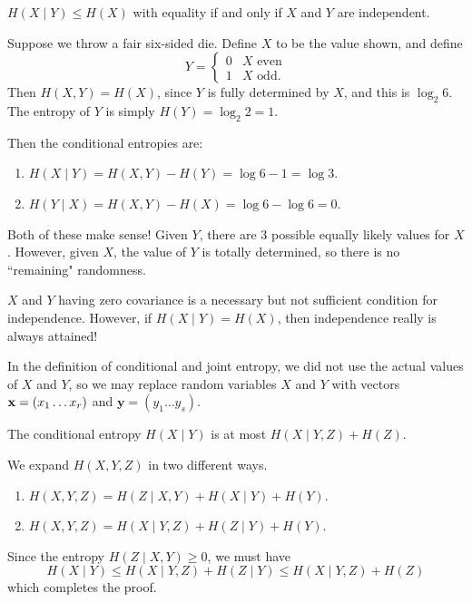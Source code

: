 \documentclass{article}
\begin{document}
\begin{corollary}
    $H(X \mid Y) \leq H(X)$
    with equality if and only if $X$ and $Y$ are independent.
\end{corollary}

\begin{example}
    Suppose we throw a fair six-sided die.
    Define $X$ to be the value shown, and define
    \[
	Y = \begin{cases}
		0 & X \text{ even} \\
		1 & X \text{ odd}.
	\end{cases}
	\]
	Then $H(X, Y) = H(X)$,
	since $Y$ is fully determined by $X$,
	and this is $\log_2 6$.
	The entropy of $Y$ is simply $H(Y) = \log_2 2 = 1$.
	
	Then the conditional entropies are:
	\begin{enumerate}
    	\item $H(X \mid Y) = H(X, Y) - H(Y) = \log 6 - 1 = \log 3$.
    	\item $H(Y \mid X) = H(X, Y) - H(X) = \log 6 - \log 6 = 0$.
	\end{enumerate}
	Both of these make sense!
	Given $Y$, there are 3 possible equally likely values for $X$.
	However, given $X$, the value of $Y$ is totally determined,
	so there is no ``remaining" randomness.
\end{example}

\begin{note}
	$X$ and $Y$ having zero covariance
	is a necessary but not sufficient condition for independence.
	However, if $H(X \mid Y) = H(X)$,
	then independence really is always attained!
\end{note}

\begin{note}
	In the definition of conditional and joint entropy, we did not use the actual values of $X$ and $Y$, so we may replace random variables $X$ and $Y$ with vectors $\mathbf{x} = (x_1 \dots x_r)$ and $\mathbf y = (y_1 \dots y_s)$.
\end{note}

\begin{proposition}
	\label{double-conditional-entropy}
    The conditional entropy $H(X \mid Y)$
    is at most $H(X \mid Y, Z) + H(Z)$.
\end{proposition}
\begin{prf}
    We expand $H(X, Y, Z)$ in two different ways.
    
    \begin{enumerate}
    	\item $H(X, Y, Z) = H(Z \mid X, Y) + H(X \mid Y) + H(Y)$.
    	\item $H(X, Y, Z) = H(X \mid Y, Z) + H(Z \mid Y) + H(Y)$.
	\end{enumerate}
	
	Since the entropy $H(Z \mid X, Y) \geq 0$, we must have
	\[
	H(X \mid Y) \leq
	H(X \mid Y, Z) + H(Z \mid Y) \leq
	H(X \mid Y, Z) + H(Z)
	\]
	which completes the proof.
\end{prf}
\end{document}
